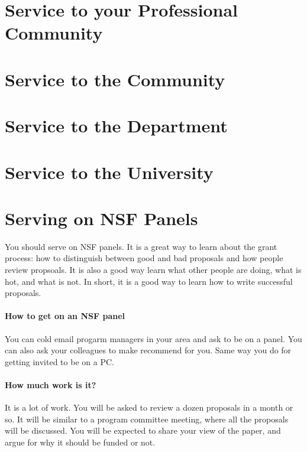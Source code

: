 \documentclass[oneside,11pt]{memoir}
\begin{document}
\section{Service to your Professional Community}
\section{Service to the Community}
\section{Service to the Department}
\section{Service to the University}
\section{Serving on NSF Panels}


You should serve on NSF panels.  It is a great way to learn about the grant process: how to distinguish between good and bad proposals and how people review propsoals.
It is also a good way learn what other people are doing, what is hot, and what is not. In short, it is a good way to learn how to write successful proposals.

\paragraph{How to get on an NSF panel} You can cold email progarm managers in your area and ask to be on a panel.  You can also ask your colleagues to make recommend for you. Same way you do for getting invited to be on a PC.

\paragraph{How much work is it?} It is a lot of work.  You will be asked to review a dozen proposals in a month or so.  It will be similar to a program committee meeting, where all the proposals will be discussed.  You will be expected to share your view of the paper, and argue for why it should be funded or not.

\end{document}
